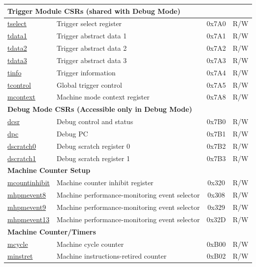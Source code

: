 \begin{longtable}{ | p{4.0cm} | p{8.4cm} | c | l | }
\multicolumn{4}{|l|}{\textbf{Trigger Module CSRs (shared with Debug Mode)}} \\\hline
\hyperref[regdesc:TSELECT]{tselect} & Trigger select register & 0x7A0 & R/W \\\hline
\hyperref[regdesc:TDATA1]{tdata1} & Trigger abstract data 1 & 0x7A1 & R/W \\\hline
\hyperref[regdesc:TDATA2]{tdata2} & Trigger abstract data 2 & 0x7A2 & R/W \\\hline
\hyperref[regdesc:TDATA3]{tdata3} & Trigger abstract data 3 & 0x7A3 & R/W \\\hline
\hyperref[regdesc:TINFO]{tinfo} & Trigger information & 0x7A4 & R/W \\\hline
\hyperref[regdesc:TCONTROL]{tcontrol} & Global trigger control & 0x7A5 & R/W \\\hline
\hyperref[regdesc:MCONTEXT]{mcontext} & Machine mode context register & 0x7A8 & R/W \\\hline
\multicolumn{4}{|l|}{\textbf{Debug Mode CSRs (Accessible only in Debug Mode)}} \\\hline
\hyperref[regdesc:DCSR]{dcsr} & Debug control and status  & 0x7B0 & R/W \\\hline
\hyperref[regdesc:DPC]{dpc} & Debug PC & 0x7B1 & R/W \\\hline
\hyperref[regdesc:DSCRATCH0]{dscratch0} & Debug scratch register 0 & 0x7B2 & R/W \\\hline
\hyperref[regdesc:DSCRATCH1]{dscratch1} & Debug scratch register 1 & 0x7B3 & R/W \\\hline
\multicolumn{4}{|l|}{\textbf{Machine Counter Setup}} \\\hline
\hyperref[regdesc:MCOUNTINHIBIT]{mcountinhibit} & Machine counter inhibit register & 0x320 & R/W \\\hline
\hyperref[regdesc:MHPMEVENT8]{mhpmevent8} & Machine performance-monitoring event selector & 0x308 & R/W \\\hline
\hyperref[regdesc:MHPMEVENT9]{mhpmevent9} & Machine performance-monitoring event selector & 0x329& R/W \\\hline
\hyperref[regdesc:MHPMEVENT13]{mhpmevent13} & Machine performance-monitoring event selector & 0x32D & R/W \\\hline
\multicolumn{4}{|l|}{\textbf{Machine Counter/Timers}} \\\hline
\hyperref[regdesc:MCYCLE]{mcycle} & Machine cycle counter & 0xB00 & R/W \\\hline
\hyperref[regdesc:MINSTRET]{minstret} & Machine instructions-retired counter & 0xB02 & R/W \\\hline

\end{longtable}
